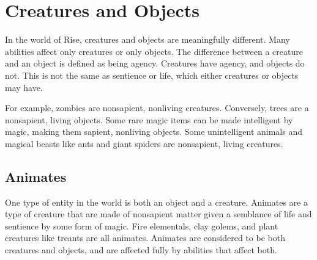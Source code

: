 \section{Creatures and Objects}
    In the world of Rise, creatures and objects are meaningfully different.
    Many abilities affect only creatures or only objects.
    The difference between a creature and an object is defined as being agency.
    Creatures have agency, and objects do not.
    This is not the same as sentience or life, which either creatures or objects may have.

    For example, zombies are nonsapient, nonliving creatures.
    Conversely, trees are a nonsapient, living objects.
    Some rare magic items can be made intelligent by magic, making them sapient, nonliving objects.
    Some unintelligent animals and magical beasts like ants and giant spiders are nonsapient, living creatures.

    \subsection{Animates}
        One type of entity in the world is both an object and a creature.
        Animates are a type of creature that are made of nonsapient matter given a semblance of life and sentience by some form of magic.
        Fire elementals, clay golems, and plant creatures like treants are all animates.
        Animates are considered to be both creatures and objects, and are affected fully by abilities that affect both.

